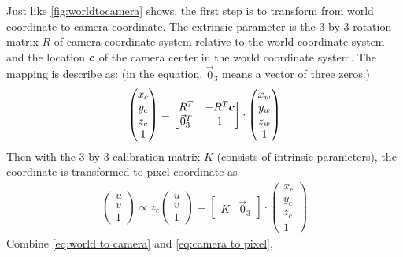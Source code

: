 Just like \ref{fig:worldtocamera} shows, the first step is to transform from world coordinate to camera coordinate. The extrinsic parameter is the 3 by 3 rotation matrix $R$ of camera coordinate system relative to the world coordinate system and the location $\boldsymbol{c}$ of the camera center in the world coordinate system. The mapping is describe as: (in the equation, $\vec{0}_{3}$ means a vector of three zeros.)
\begin{align}\label{eq:world to camera}
	\begin{pmatrix}
	 		x_c\\
	 		y_c\\
	 		z_c\\
	 		1
	\end{pmatrix}=
	\begin{bmatrix}R^T & -R^T \boldsymbol{c} \\
		\vec{0}_{3}^T & 1
	\end{bmatrix}
	 \cdot \begin{pmatrix}
	x_w\\y_w\\z_w\\1
\end{pmatrix}
\end{align}
Then with the 3 by 3 calibration matrix $K$ (consists of intrinsic parameters), the coordinate is transformed to pixel coordinate as 
\begin{align}\label{eq:camera to pixel}
	\begin{pmatrix}
		u\\
		v\\
		1
	\end{pmatrix} \propto z_c \begin{pmatrix}
	u\\
	v\\
	1
	\end{pmatrix} = \begin{bmatrix}
	K&\vec{0}_{3}\end{bmatrix} \cdot \begin{pmatrix}
	x_c\\
	y_c\\
	z_c\\
	1
\end{pmatrix}
\end{align}
Combine \cref{eq:world to camera} and \cref{eq:camera to pixel}, 
